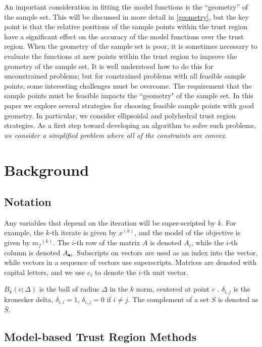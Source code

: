 \documentclass{article}
\theoremstyle{case}
\newcommand{\xk}{{x^{(k)}}}
\newcommand{\mfk}{{{m}_f}^{(k)}}
\begin{document}
An important consideration in fitting the model functions is the ``geometry'' of the sample set.
This will be discussed in more detail in \cref{geometry}, but the key point is that the relative positions of the sample points within the trust region have a significant effect on the accuracy of the model functions over the trust region.
When the geometry of the sample set is poor, it is sometimes necessary to evaluate the functions at new points within the trust region to improve the geometry of the sample set.
It is well understood how to do this for unconstrained problems; but for constrained problems with all feasible sample points, some interesting challenges must be overcome.
The requirement that the sample points must be feasible impacts the ``geometry" of the sample set.
In this paper we explore several strategies for choosing feasible sample points with good geometry.
In particular, we consider ellipsoidal and polyhedral trust region strategies.
As a first step toward developing an algorithm to solve such problems, \emph{we consider a simplified problem where all of the constraints are convex}.


\section{Background}

\subsection{Notation}

Any variables that depend on the iteration will be super-scripted by $k$.
For example, the $k$-th iterate is given by $\xk$, and the model of the objective is given by $\mfk$.
The $i$-th row of the matrix $A$ is denoted $A_i$, while the $i$-th column is denoted $A_{\bullet i}$.
Subscripts on vectors are used as an index into the vector, while vectors in a sequence of vectors use superscripts.
Matrices are denoted with capital letters, and we use $e_i$ to denote the $i$-th unit vector.                     %

$B_k(c; \Delta)$ is the ball of radius $\Delta$ in the $k$ norm, centered at point $c$ .
$\delta_{i,j}$ is the kronecker delta, $\delta_{i,i} = 1$, $\delta_{i,j} = 0$ if $i\ne j$.
The complement of a set $S$ is denoted as $\bar S$.


\subsection{Model-based Trust Region Methods}
\end{document}

